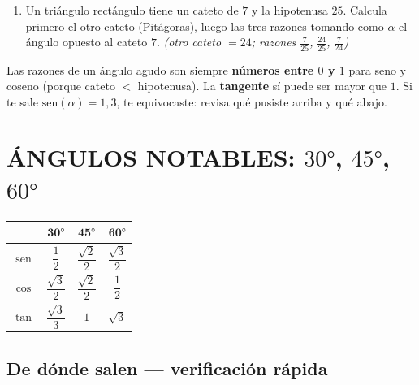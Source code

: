 \documentclass[11pt,a4paper]{article}
\begin{document}
\begin{enumerate}[label=\textbf{\arabic*.},leftmargin=1cm,itemsep=8pt,start=3]
  \item Un triángulo rectángulo tiene un cateto de $7$ y la hipotenusa $25$. Calcula primero el otro cateto (Pitágoras), luego las tres razones tomando como $\alpha$ el ángulo opuesto al cateto $7$.
  \hfill \textit{(otro cateto $= 24$; razones $\frac{7}{25}$, $\frac{24}{25}$, $\frac{7}{24}$)}
\end{enumerate}

\begin{tcolorbox}[tip]
Las razones de un ángulo agudo son siempre \textbf{números entre $0$ y $1$} para seno y coseno (porque cateto $<$ hipotenusa). La \textbf{tangente} sí puede ser mayor que $1$. Si te sale $\mathrm{sen}(\alpha) = 1{,}3$, te equivocaste: revisa qué pusiste arriba y qué abajo.
\end{tcolorbox}

\newpage

\section{ÁNGULOS NOTABLES: $30°$, $45°$, $60°$}

\begin{tcolorbox}[propiedad, title=Tabla de memoria]
\begin{center}
\renewcommand{\arraystretch}{1.6}
\begin{tabular}{@{}c|ccc@{}}
\toprule
 & $\mathbf{30°}$ & $\mathbf{45°}$ & $\mathbf{60°}$ \\
\midrule
$\mathrm{sen}$ & $\dfrac{1}{2}$ & $\dfrac{\sqrt{2}}{2}$ & $\dfrac{\sqrt{3}}{2}$ \\
$\cos$         & $\dfrac{\sqrt{3}}{2}$ & $\dfrac{\sqrt{2}}{2}$ & $\dfrac{1}{2}$ \\
$\tan$         & $\dfrac{\sqrt{3}}{3}$ & $1$ & $\sqrt{3}$ \\
\bottomrule
\end{tabular}
\end{center}
\end{tcolorbox}

\subsection{De dónde salen --- verificación rápida}
\end{document}
